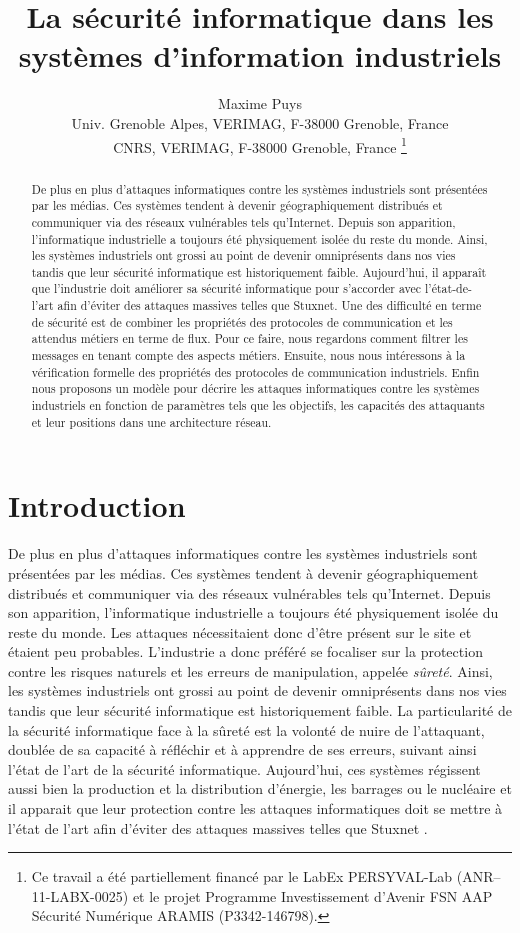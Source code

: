 \documentclass{article}
\title{La sécurité informatique dans les systèmes d'information industriels}
\author{
    Maxime Puys\\
    Univ. Grenoble Alpes, VERIMAG, F-38000 Grenoble, France\\
    CNRS, VERIMAG, F-38000 Grenoble, France
    \thanks{Ce travail a été partiellement financé par le LabEx PERSYVAL-Lab (ANR–11-LABX-0025) et le projet Programme Investissement d’Avenir FSN AAP Sécurité Numérique \no 3 ARAMIS (P3342-146798).}
}
\date{}
\begin{document}
\maketitle

\begin{abstract}
    De plus en plus d’attaques informatiques contre les systèmes industriels
    sont présentées par les médias.
    Ces systèmes tendent à devenir géographiquement distribués et communiquer
    via des réseaux vulnérables tels qu’Internet.
    Depuis son apparition, l’informatique industrielle a toujours été
    physiquement isolée du reste du monde.
    Ainsi, les systèmes industriels ont grossi au point de devenir omniprésents
    dans nos vies tandis que leur sécurité informatique est historiquement
    faible.
    Aujourd'hui, il apparaît que l'industrie doit améliorer sa sécurité
    informatique pour s'accorder avec l'état-de-l'art afin d'éviter des
    attaques massives telles que Stuxnet.
    Une des difficulté en terme de sécurité est de combiner les propriétés des
    protocoles de communication et les attendus métiers en terme de flux.
    Pour ce faire, nous regardons comment filtrer les messages en tenant compte
    des aspects métiers.
    Ensuite, nous nous intéressons à la vérification formelle des propriétés
    des protocoles de communication industriels.
    Enfin nous proposons un modèle pour décrire les attaques informatiques
    contre les systèmes industriels en fonction de paramètres tels que les
    objectifs, les capacités des attaquants et leur positions dans une
    architecture réseau.
\end{abstract}

\section{Introduction}

De plus en plus d'attaques informatiques contre les systèmes industriels sont
présentées par les médias.
Ces systèmes tendent à devenir géographiquement distribués et communiquer via
des réseaux vulnérables tels qu'Internet.
Depuis son apparition, l'informatique industrielle a toujours été physiquement
isolée du reste du monde.
Les attaques nécessitaient donc d'être présent sur le site et étaient peu
probables.
L'industrie a donc préféré se focaliser sur la protection contre les risques
naturels et les erreurs de manipulation, appelée {\em sûreté}.
Ainsi, les systèmes industriels ont grossi au point de devenir omniprésents
dans nos vies tandis que leur sécurité informatique est historiquement faible.
La particularité de la sécurité informatique face à la sûreté est la volonté
de nuire de l'attaquant, doublée de sa capacité à réfléchir et à apprendre de
ses erreurs, suivant ainsi l'état de l'art de la sécurité informatique.
Aujourd'hui, ces systèmes régissent aussi bien la production et la distribution
d'énergie, les barrages ou le nucléaire et il apparait que leur protection
contre les attaques informatiques doit se mettre à l'état de l'art afin d'éviter
des attaques massives telles que Stuxnet \cite{Lan11}.
\end{document}
